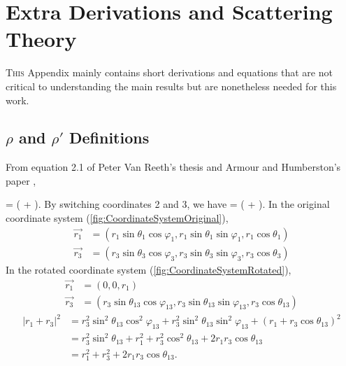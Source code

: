 \documentclass[Dissertation.tex]{subfiles}
\begin{document}
\chapter{Extra Derivations and Scattering Theory}
\label{chp:ExtraDer}

\lettrine{\textcolor{startcolor}{T}}{his} Appendix mainly contains short derivations and equations that are not 
critical to understanding the main results but are nonetheless needed for 
this work.

\section{\texorpdfstring{$\rho$ and $\rho'$} {rho and rho'} Definitions}
\label{sec:RhoDef}
From equation 2.1 of Peter Van Reeth's thesis \cite{VanReethThesis} and Armour and Humberston's paper \cite{Armour1991},

\beq
\vec{\rho} =  \left(  +  \right).
\label{eq:RhoDef1}
\eeq
By switching coordinates 2 and 3, we have
\beq
{} =  \left(  +  \right).
\label{eq:RhoDef2}
\eeq
In the original coordinate system (\cref{fig:CoordinateSystemOriginal}),
\begin{align}
\nonumber \vec{r_1} &= \left( r_1 \sin \theta_1 \cos \varphi_1, r_1 \sin \theta_1 \sin \varphi_1, r_1 \cos \theta_1 \right) \\
\vec{r_3} &= \left( r_3 \sin \theta_3 \cos \varphi_3, r_3 \sin \theta_3 \sin \varphi_3, r_3 \cos \theta_3 \right)
\end{align}
In the rotated coordinate system (\cref{fig:CoordinateSystemRotated}),
\begin{align}
\nonumber \vec{r_1} &= (0, 0, r_1) \\
\vec{r_3} &= \left( r_3 \sin \theta_{13} \cos \varphi_{13}, r_3 \sin \theta_{13} \sin \varphi_{13}, r_3 \cos \theta_{13} \right)
\end{align}
\begin{align}
\nonumber \left| r_1 + r_3 \right|^2 &= r_3^2 \sin^2 \theta_{13} \cos^2 \varphi_{13} + r_3^2 \sin^2 \theta_{13} \sin^2 \varphi_{13} + (r_1 + r_3 \cos \theta_{13})^2\\
\nonumber &= r_3^2 \sin^2 \theta_{13} + r_1^2 + r_3^2 \cos^2 \theta_{13} + 2 r_1 r_3 \cos \theta_{13} \\
&= r_1^2 + r_3^2 + 2 r_1 r_3 \cos \theta_{13}.
\label{eq:RhoDef3}
\end{align}
\end{document}
